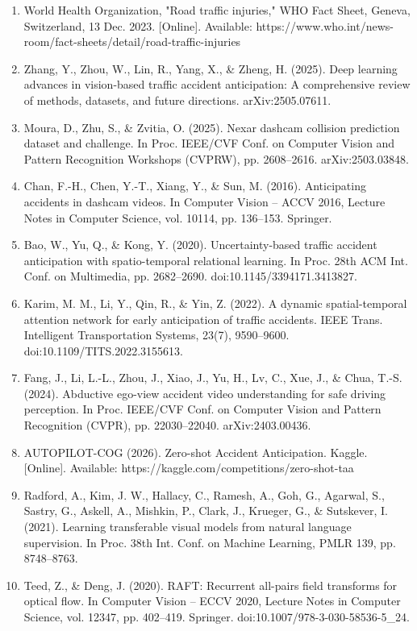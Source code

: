 \begin{enumerate}
\def\labelenumi{\arabic{enumi}.}
\item
  World Health Organization, "Road traffic injuries," WHO Fact Sheet, Geneva, Switzerland, 13 Dec. 2023. {[}Online{]}. Available: https://www.who.int/news-room/fact-sheets/detail/road-traffic-injuries
\item
  Zhang, Y., Zhou, W., Lin, R., Yang, X., \& Zheng, H. (2025). Deep learning advances in vision-based traffic accident anticipation: A comprehensive review of methods, datasets, and future directions. arXiv:2505.07611.
\item
  Moura, D., Zhu, S., \& Zvitia, O. (2025). Nexar dashcam collision prediction dataset and challenge. In Proc. IEEE/CVF Conf. on Computer Vision and Pattern Recognition Workshops (CVPRW), pp. 2608--2616. arXiv:2503.03848.
\item
  Chan, F.-H., Chen, Y.-T., Xiang, Y., \& Sun, M. (2016). Anticipating accidents in dashcam videos. In Computer Vision -- ACCV 2016, Lecture Notes in Computer Science, vol. 10114, pp. 136--153. Springer.
\item
  Bao, W., Yu, Q., \& Kong, Y. (2020). Uncertainty-based traffic accident anticipation with spatio-temporal relational learning. In Proc. 28th ACM Int. Conf. on Multimedia, pp. 2682--2690. doi:10.1145/3394171.3413827.
\item
  Karim, M. M., Li, Y., Qin, R., \& Yin, Z. (2022). A dynamic spatial-temporal attention network for early anticipation of traffic accidents. IEEE Trans. Intelligent Transportation Systems, 23(7), 9590--9600. doi:10.1109/TITS.2022.3155613.
\item
  Fang, J., Li, L.-L., Zhou, J., Xiao, J., Yu, H., Lv, C., Xue, J., \& Chua, T.-S. (2024). Abductive ego-view accident video understanding for safe driving perception. In Proc. IEEE/CVF Conf. on Computer Vision and Pattern Recognition (CVPR), pp. 22030--22040. arXiv:2403.00436.
\item
  AUTOPILOT-COG (2026). Zero-shot Accident Anticipation. Kaggle. {[}Online{]}. Available: https://kaggle.com/competitions/zero-shot-taa
\item
  Radford, A., Kim, J. W., Hallacy, C., Ramesh, A., Goh, G., Agarwal, S., Sastry, G., Askell, A., Mishkin, P., Clark, J., Krueger, G., \& Sutskever, I. (2021). Learning transferable visual models from natural language supervision. In Proc. 38th Int. Conf. on Machine Learning, PMLR 139, pp. 8748--8763.
\item
  Teed, Z., \& Deng, J. (2020). RAFT: Recurrent all-pairs field transforms for optical flow. In Computer Vision -- ECCV 2020, Lecture Notes in Computer Science, vol. 12347, pp. 402--419. Springer. doi:10.1007/978-3-030-58536-5\_24.

\end{enumerate}
